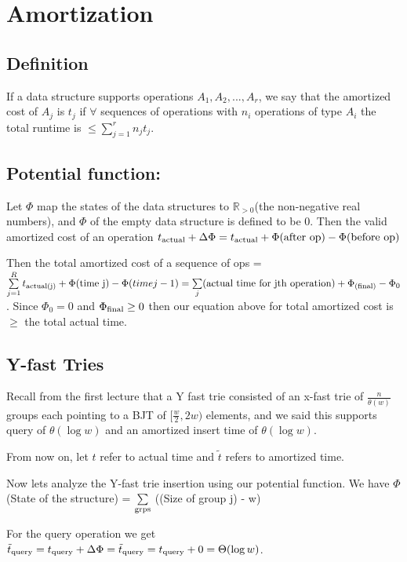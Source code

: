 \documentclass[11pt]{article}
\newcommand{\R}{\mathbb{R}}
\begin{document}
\section {Amortization}

\subsection{Definition}  If a data structure supports operations $A_1, A_2, ... ,A_r$, we say that the amortized cost of $A_j$ is $t_j$ if $\forall$ sequences of operations with $n_i$ operations of type $A_i$ the total runtime is $\leq \sum\limits_{j=1}^r n_j t_j$.


\subsection{Potential function:} Let $\Phi$ map the states of the data structures to $\R_{>0}$(the non-negative real numbers), and $\Phi$ of the empty data structure is defined to be 0.  Then the valid amortized cost of an operation $t_{\textnormal{actual}} + \Delta\Phi = t_{\textnormal{actual}} + \Phi(\textnormal{after op}) - \Phi(\textnormal{before op})$

Then the total amortized cost of a sequence of ops = $\sum\limits_{j=1}^R t_{\textnormal{actual(j)}} + \Phi(\textnormal{time j)} - \Phi(time j-1) = \sum\limits_j (\textnormal{actual time for jth operation}) + \Phi_{\textnormal{(final)}} - \Phi_0$.  Since $\Phi_0 = 0$ and $\Phi_{\textnormal{final}} \geq 0$ then our equation above for total amortized cost is $\geq$ the total actual time.

\subsection{Y-fast Tries}

Recall from the first lecture that a Y fast trie consisted of an x-fast trie of $\frac{n}{\theta(w)}$ groups each pointing to a BJT of $[\frac{w}{2}, 2w)$ elements, and we said this supports query of $\theta(\log w)$ and an amortized insert time of $\theta(\log w)$.

From now on, let $t$ refer to actual time and $\tilde{t}$ refers to amortized time.

Now lets analyze the Y-fast trie insertion using our potential function.  We have $\Phi$(State of the structure) = $\sum\limits_{\textnormal{grps}}$ ((Size of group j) - w)

For the query operation we get $\tilde{t}_{\textnormal{query}} = t_{\textnormal{query}} + \Delta \Phi = \tilde{t}_{\textnormal{query}} = t_{\textnormal{query}} + 0 = \Theta(\log w)$.
\end{document}
